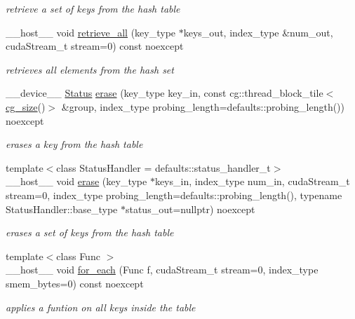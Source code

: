 \begin{DoxyCompactItemize}
\begin{DoxyCompactList}\small\item\em retrieve a set of keys from the hash table \end{DoxyCompactList}\item 
\+\_\+\+\_\+host\+\_\+\+\_\+ void \hyperlink{classwarpcore_1_1HashSet_a6a178adc0aac5636950e84134bc851cc}{retrieve\+\_\+all} (key\+\_\+type $\ast$keys\+\_\+out, index\+\_\+type \&num\+\_\+out, cuda\+Stream\+\_\+t stream=0) const noexcept
\begin{DoxyCompactList}\small\item\em retrieves all elements from the hash set \end{DoxyCompactList}\item 
\+\_\+\+\_\+device\+\_\+\+\_\+ \hyperlink{classwarpcore_1_1Status}{Status} \hyperlink{classwarpcore_1_1HashSet_a255b77ba7f1ba8a1faabddfd92ae976c}{erase} (key\+\_\+type key\+\_\+in, const cg\+::thread\+\_\+block\+\_\+tile$<$ \hyperlink{classwarpcore_1_1HashSet_a0906259ae0be4a4f6f9ba74b4874e542}{cg\+\_\+size}()$>$ \&group, index\+\_\+type probing\+\_\+length=defaults\+::probing\+\_\+length()) noexcept
\begin{DoxyCompactList}\small\item\em erases a key from the hash table \end{DoxyCompactList}\item 
{\footnotesize template$<$class Status\+Handler  = defaults\+::status\+\_\+handler\+\_\+t$>$ }\\\+\_\+\+\_\+host\+\_\+\+\_\+ void \hyperlink{classwarpcore_1_1HashSet_a0480bc6e9197ccc13a50155d830adfb4}{erase} (key\+\_\+type $\ast$keys\+\_\+in, index\+\_\+type num\+\_\+in, cuda\+Stream\+\_\+t stream=0, index\+\_\+type probing\+\_\+length=defaults\+::probing\+\_\+length(), typename Status\+Handler\+::base\+\_\+type $\ast$status\+\_\+out=nullptr) noexcept
\begin{DoxyCompactList}\small\item\em erases a set of keys from the hash table \end{DoxyCompactList}\item 
{\footnotesize template$<$class Func $>$ }\\\+\_\+\+\_\+host\+\_\+\+\_\+ void \hyperlink{classwarpcore_1_1HashSet_a8719aee40fca90a39085ac0253bbdd01}{for\+\_\+each} (Func f, cuda\+Stream\+\_\+t stream=0, index\+\_\+type smem\+\_\+bytes=0) const noexcept
\begin{DoxyCompactList}\small\item\em applies a funtion on all keys inside the table \end{DoxyCompactList}\item 

\end{DoxyCompactItemize}

